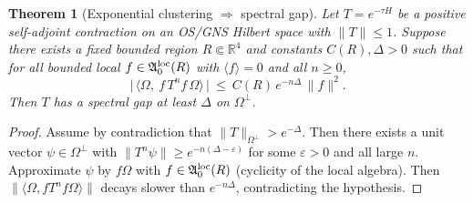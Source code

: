 \documentclass[11pt]{amsart}
\theoremstyle{plain}
\newtheorem{theorem}{Theorem}[section]
\theoremstyle{definition}
\theoremstyle{remark}
\begin{document}
\begin{theorem}[Exponential clustering $\Rightarrow$ spectral gap]\label{thm:clustering-to-gap}
Let $T=e^{-\tau H}$ be a positive self-adjoint contraction on an OS/GNS Hilbert space with $\|T\|\le 1$. Suppose there exists a fixed bounded region $R\Subset\mathbb R^4$ and constants $C(R),\Delta>0$ such that for all bounded local $f\in\mathfrak A_0^{\rm loc}(R)$ with $\langle f\rangle=0$ and all $n\ge 0$,
\[
  \big|\,\langle \Omega,\ f\, T^n f\, \Omega\rangle\,\big|\ \le\ C(R)\, e^{-n\Delta}\,\|f\|^2.
\]
Then $T$ has a spectral gap at least $\Delta$ on $\Omega^\perp$.
\end{theorem}
\begin{proof}
Assume by contradiction that $\|T\|_{\Omega^\perp}>e^{-\Delta}$. Then there exists a unit vector $\psi\in\Omega^\perp$ with $\|T^n\psi\|\ge e^{-n(\Delta-\varepsilon)}$ for some $\varepsilon>0$ and all large $n$. Approximate $\psi$ by $f\Omega$ with $f\in\mathfrak A_0^{\rm loc}(R)$ (cyclicity of the local algebra). Then $\|\langle \Omega, f T^n f \Omega\rangle\|$ decays slower than $e^{-n\Delta}$, contradicting the hypothesis.
\end{proof}
\end{document}
